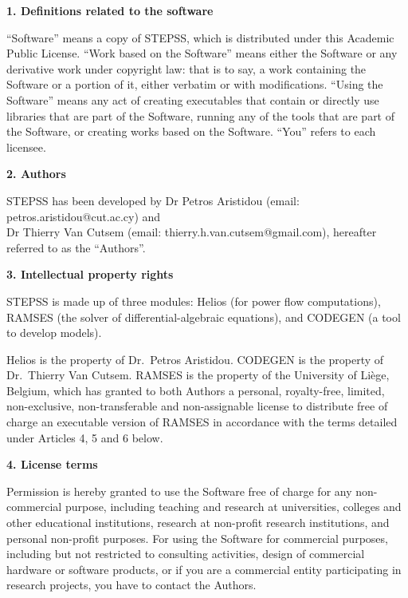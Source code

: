 \vspace*{5ex}
\begin{center}
\end{center}

{\bf \large 1. Definitions related to the software}

``Software'' means a copy of STEPSS, which is distributed under this Academic Public License. ``Work based on the Software'' means either the Software or any derivative work under copyright law: that is to say, a work containing the Software or a portion of it, either verbatim or with modifications. ``Using the Software'' means any act of creating executables that contain or directly use libraries that are part of the Software, running any of the tools that are part of the Software, or creating works based on the Software. ``You'' refers to each licensee.

{\bf \large 2. Authors}

STEPSS has been developed by Dr Petros Aristidou (email: petros.aristidou@cut.ac.cy) and\\
Dr Thierry Van Cutsem (email: thierry.h.van.cutsem@gmail.com), hereafter referred to as the ``Authors''.

{\bf \large 3. Intellectual property rights}

STEPSS is made up of three modules: Helios (for power flow computations), RAMSES (the solver of differential-algebraic equations), and CODEGEN (a tool to develop models).

Helios is the property of Dr.\ Petros Aristidou. CODEGEN is the property of Dr.\ Thierry Van Cutsem. RAMSES is the property of the University of Li\`ege, Belgium, which has granted to both Authors a personal, royalty-free, limited, non-exclusive, non-transferable and non-assignable license to distribute free of charge an executable version of RAMSES in accordance with the terms detailed under Articles 4, 5 and 6 below.

{\bf \large 4. License terms}

Permission is hereby granted to use the Software free of charge for any non-commercial purpose, including teaching and research at universities, colleges and other educational institutions, research at non-profit research institutions, and personal non-profit purposes. For using the Software for commercial purposes, including but not restricted to consulting activities, design of commercial hardware or software products, or if you are a commercial entity participating in research projects, you have to contact the Authors.

